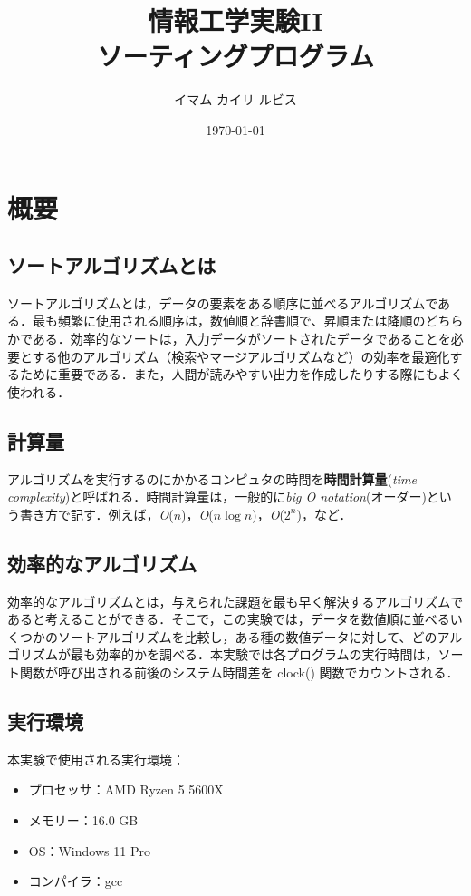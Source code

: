 \documentclass[a4j, titlepage]{jarticle}
\title{情報工学実験II\\ソーティングプログラム}
\author{イマム カイリ ルビス}
\date{\today}
\begin{document}
    \maketitle

    \tableofcontents
    \clearpage

    \section{概要}
        \subsection{ソートアルゴリズムとは}
            ソートアルゴリズムとは，データの要素をある順序に並べるアルゴリズムである．最も頻繁に使用される順序は，数値順と辞書順で、昇順または降順のどちらかである．効率的なソートは，入力データがソートされたデータであることを必要とする他のアルゴリズム（検索やマージアルゴリズムなど）の効率を最適化するために重要である．また，人間が読みやすい出力を作成したりする際にもよく使われる．
        
        \subsection{計算量}
            アルゴリズムを実行するのにかかるコンピュタの時間を\textbf{時間計算量}(\textit{time complexity})と呼ばれる．時間計算量は，一般的に\textit{big O notation}(オーダー)という書き方で記す．例えば，\textit{O}($n$)，\textit{O}($n \log n$)，\textit{O}($2^n$)，など．

        \subsection{効率的なアルゴリズム}
            効率的なアルゴリズムとは，与えられた課題を最も早く解決するアルゴリズムであると考えることができる．そこで，この実験では，データを数値順に並べるいくつかのソートアルゴリズムを比較し，ある種の数値データに対して、どのアルゴリズムが最も効率的かを調べる．本実験では各プログラムの実行時間は，ソート関数が呼び出される前後のシステム時間差を clock() 関数でカウントされる．

        \subsection{実行環境}
            本実験で使用される実行環境：
            \begin{itemize}
                \item プロセッサ：AMD Ryzen 5 5600X
                \item メモリー：16.0 GB
                \item OS：Windows 11 Pro
                \item コンパイラ：gcc
            \end{itemize}
        
\end{document}
